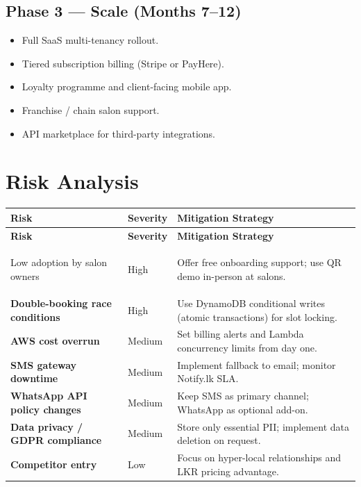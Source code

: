 \documentclass[12pt,a4paper]{report}
\begin{document}
\section{Phase 3 — Scale (Months 7–12)}

\begin{itemize}[leftmargin=2em]
  \item Full SaaS multi-tenancy rollout.
  \item Tiered subscription billing (Stripe or PayHere).
  \item Loyalty programme and client-facing mobile app.
  \item Franchise / chain salon support.
  \item API marketplace for third-party integrations.
\end{itemize}

\chapter{Risk Analysis}

\begin{longtable}{>{\bfseries}p{4cm} p{3cm} p{7cm}}
  \toprule
  \textbf{Risk} & \textbf{Severity} & \textbf{Mitigation Strategy} \\
  \midrule
  \endfirsthead
  \toprule
  \textbf{Risk} & \textbf{Severity} & \textbf{Mitigation Strategy} \\
  \midrule
  \endhead
  \bottomrule
  \endfoot

  Low adoption by salon owners       & High   & Offer free onboarding support; use QR demo in-person at salons. \\[6pt]
  Double-booking race conditions     & High   & Use DynamoDB conditional writes (atomic transactions) for slot locking. \\[6pt]
  AWS cost overrun                   & Medium & Set billing alerts and Lambda concurrency limits from day one. \\[6pt]
  SMS gateway downtime               & Medium & Implement fallback to email; monitor Notify.lk SLA. \\[6pt]
  WhatsApp API policy changes        & Medium & Keep SMS as primary channel; WhatsApp as optional add-on. \\[6pt]
  Data privacy / GDPR compliance     & Medium & Store only essential PII; implement data deletion on request. \\[6pt]
  Competitor entry                   & Low    & Focus on hyper-local relationships and LKR pricing advantage. \\
\end{longtable}
\end{document}
